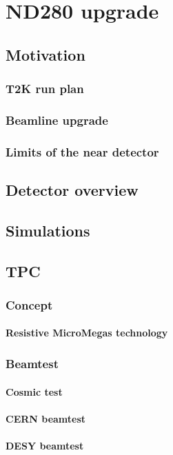 \documentclass[../main.tex]{subfiles}
\begin{document}
\part{ND280 upgrade}
\label{pt:up}

\chapter{Motivation}
\section{T2K run plan}
\section{Beamline upgrade}
\section{Limits of the near detector}
\chapter{Detector overview}
\chapter{Simulations}

\chapter{TPC}
\section{Concept}
\subsection{Resistive MicroMegas technology}
\section{Beamtest}
\subsection{Cosmic test}
\subsection{CERN beamtest}
\subsection{DESY beamtest}
\end{document}
